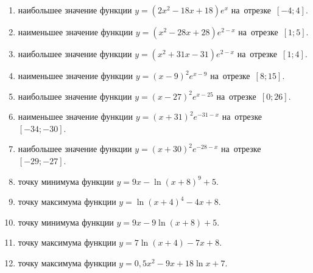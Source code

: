 \documentclass[a4paper,10pt]{article}
\begin{document}
\begin{enumerate}
\item {} наибольшее значение функции $y=\left(2x^2 -18x +18\right)e^{x}$ на~отрезке~$\left[-4;4\right]$.

\item {} наименьшее значение функции $y=\left(x^2 -28x +28\right)e^{2-x}$ на~отрезке~$\left[1;5\right]$.

\item {} наибольшее значение функции $y=\left(x^2 +31x -31\right)e^{2-x}$ на~отрезке~$\left[1;4\right]$.

\item {} наименьшее значение функции $y=\left(x-9\right)^2e^{x-9}$ на~отрезке~$\left[8;15\right]$.







\item {} наибольшее значение функции $y=\left(x-27\right)^2e^{x-25}$ на~отрезке~$\left[0;26\right]$.







\item {} наименьшее значение функции $y=\left(x+31\right)^2e^{-31-x}$ на~отрезке~$\left[-34;-30\right]$.







\item {} наибольшее значение функции $y=\left(x+30\right)^2e^{-28-x}$ на~отрезке~$\left[-29;-27\right]$.







\item {} точку минимума функции $y=9x-\ln\left(x+8\right)^{9}+5$.

\item {} точку максимума функции $y=\ln\left(x+4\right)^{4}-4x+8$.

\item {} точку минимума функции $y=9x-9\ln\left(x+8\right)+5$.

\item {} точку максимума функции $y=7\ln\left(x+4\right)-7x+8$.

\item {} точку максимума функции $y=0,5x^2-9x+18\ln x +7$.


\end{enumerate}
\end{document}
